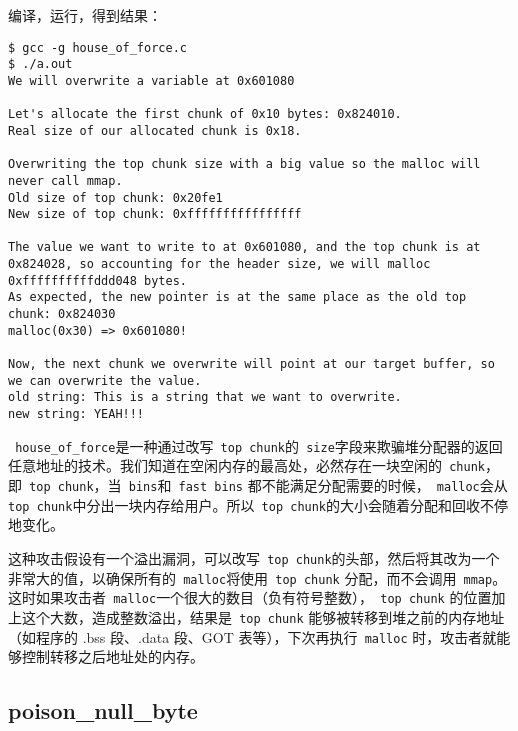 编译，运行，得到结果：
\begin{verbatim}
$ gcc -g house_of_force.c
$ ./a.out 
We will overwrite a variable at 0x601080

Let's allocate the first chunk of 0x10 bytes: 0x824010.
Real size of our allocated chunk is 0x18.

Overwriting the top chunk size with a big value so the malloc will never call mmap.
Old size of top chunk: 0x20fe1
New size of top chunk: 0xffffffffffffffff

The value we want to write to at 0x601080, and the top chunk is at 0x824028, so accounting for the header size, we will malloc 0xffffffffffddd048 bytes.
As expected, the new pointer is at the same place as the old top chunk: 0x824030
malloc(0x30) => 0x601080!

Now, the next chunk we overwrite will point at our target buffer, so we can overwrite the value.
old string: This is a string that we want to overwrite.
new string: YEAH!!!
\end{verbatim}

\verb+ house_of_force+是一种通过改写\verb+ top chunk+的\verb+ size+字段来欺骗堆分配器的返回任意地址的技术。我们知道在空闲内存的最高处，必然存在一块空闲的\verb+ chunk+，即\verb+ top chunk+，当\verb+ bins+和\verb+ fast bins+ 都不能满足分配需要的时候，\verb+ malloc+会从\verb+ top chunk+中分出一块内存给用户。所以\verb+ top chunk+的大小会随着分配和回收不停地变化。

这种攻击假设有一个溢出漏洞，可以改写\verb+ top chunk+的头部，然后将其改为一个非常大的值，以确保所有的\verb+ malloc+将使用\verb+ top chunk+ 分配，而不会调用\verb+ mmap+。这时如果攻击者\verb+ malloc+一个很大的数目（负有符号整数），\verb+ top chunk+ 的位置加上这个大数，造成整数溢出，结果是\verb+ top chunk+ 能够被转移到堆之前的内存地址（如程序的 .bss 段、.data 段、GOT 表等），下次再执行\verb+ malloc+ 时，攻击者就能够控制转移之后地址处的内存。

\subsection{poison\_null\_byte}

